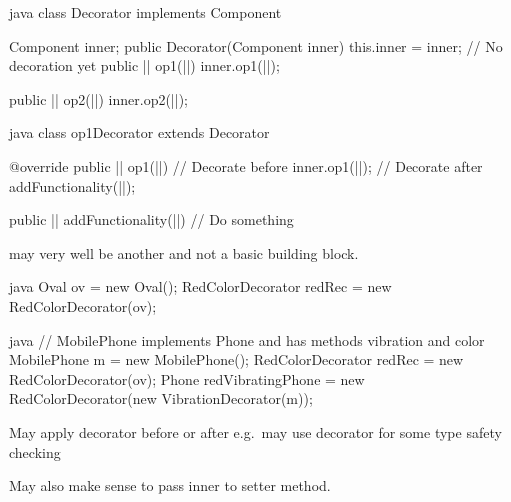 \begin{codeboxNl}[Decorator]{java}
class Decorator implements Component{
  Component inner;
  public Decorator(Component inner){
    this.inner = inner;
  }
  // No decoration yet
  public || op1(||){
    inner.op1(||);
  }

  public || op2(||){
    inner.op2(||);
  }
}
\end{codeboxNl}
\begin{codeboxNl}{java}
class op1Decorator extends Decorator{
  @override
  public || op1(||){
    // Decorate before
    inner.op1(||);
    // Decorate after
    addFunctionality(||);
  }

  public || addFunctionality(||){
    // Do something
  }
}
\end{codeboxNl}
\begin{notebox}[Note]\nospacing
   may very well be another 
  and not a basic building block.
\end{notebox}
\begin{codeboxNl}[Client]{java}
  Oval ov = new Oval();
  RedColorDecorator redRec = new RedColorDecorator(ov);
\end{codeboxNl}
\begin{codeboxNl}{java}
  // MobilePhone implements Phone and has methods vibration and color
  MobilePhone m = new MobilePhone();
  RedColorDecorator redRec = new RedColorDecorator(ov);
  Phone redVibratingPhone =
          new RedColorDecorator(new VibrationDecorator(m));
\end{codeboxNl}
\begin{notebox}[Notes]\nospacing
  \begin{itemizenosep}
      \item May apply decorator before or after e.g.\
      may use decorator for some type safety checking
      \item 
  May also make sense to pass inner to setter method.
  \end{itemizenosep}
\end{notebox}
